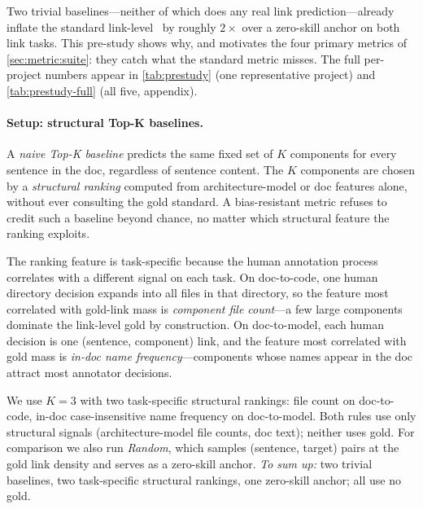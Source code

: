 Two trivial baselines---neither of which does any real link prediction---already inflate the standard link-level \fone\ by roughly $2\times$ over a zero-skill anchor on both link tasks.
This pre-study shows why, and motivates the four primary metrics of \autoref{sec:metric:suite}: they catch what the standard metric misses.
The full per-project numbers appear in \autoref{tab:prestudy} (one representative project) and \autoref{tab:prestudy-full} (all five, appendix).

\paragraph{Setup: structural Top-K baselines.}
A \emph{naive Top-K baseline} predicts the same fixed set of $K$ components for every sentence in the doc, regardless of sentence content.
The $K$ components are chosen by a \emph{structural ranking} computed from architecture-model or doc features alone, without ever consulting the gold standard.
A bias-resistant metric refuses to credit such a baseline beyond chance, no matter which structural feature the ranking exploits.

The ranking feature is task-specific because the human annotation process correlates with a different signal on each task.
On doc-to-code, one human directory decision expands into all files in that directory, so the feature most correlated with gold-link mass is \emph{component file count}---a few large components dominate the link-level gold by construction.
On doc-to-model, each human decision is one (sentence, component) link, and the feature most correlated with gold mass is \emph{in-doc name frequency}---components whose names appear in the doc attract most annotator decisions.

We use $K{=}3$ with two task-specific structural rankings: file count on doc-to-code, in-doc case-insensitive name frequency on doc-to-model.
Both rules use only structural signals (architecture-model file counts, doc text); neither uses gold.
For comparison we also run \emph{Random}, which samples (sentence, target) pairs at the gold link density and serves as a zero-skill anchor.
\emph{To sum up:} two trivial baselines, two task-specific structural rankings, one zero-skill anchor; all use no gold.

